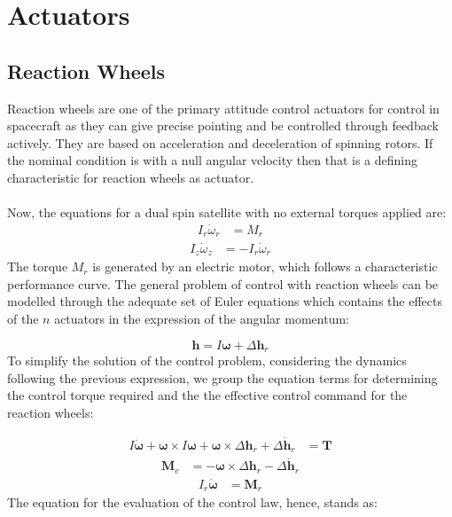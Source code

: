 \section{Actuators}
\subsection{Reaction Wheels}

Reaction wheels are one of the primary attitude control actuators for control in spacecraft as they can give precise pointing and be controlled through feedback actively. They are based on acceleration and deceleration of spinning rotors. If the nominal condition is with a null angular velocity then that is a defining characteristic for reaction wheels as actuator.\\\\
Now, the equations for a dual spin satellite with no external torques applied are:
     \begin{align*}
		  I_{r}\dot{\omega}_{r} &= M_{r}
     \end{align*}
     \begin{align*}
	    I_{z}\dot{\omega}_{z} &= -I_{r}\dot{\omega}_{r}
     \end{align*}
The torque \( M_{r} \) is generated by an electric motor, which follows a characteristic performance curve. The general problem of control with reaction wheels can be modelled through the adequate set of Euler equations which contains the effects of the \( n \) actuators in the expression of the angular momentum:

    \begin{equation*}
		\mathbf{h} = I \boldsymbol{\omega} + \Delta \mathbf{h}_r
    \end{equation*}	
To simplify the solution of the control problem, considering the dynamics following the previous expression, we group the equation terms for determining the control torque required and the the effective control command for the reaction wheels:

	\begin{align*}
	I \dot{\boldsymbol{\omega}} + \boldsymbol{\omega} \times I \boldsymbol{\omega} + \boldsymbol{\omega} \times \Delta \mathbf{h}_r + \Delta \dot{\mathbf{h}}_r &= \mathbf{T} 
	\end{align*}
	\begin{align*}
		\mathbf{M}_c &= -\boldsymbol{\omega} \times \Delta \mathbf{h}_r - \Delta \dot{\mathbf{h}}_r
	\end{align*}
	\begin{align*}
			I_r \dot{\boldsymbol{\omega}} &= \mathbf{M}_r 
	\end{align*}
The equation for the evaluation of the control law, hence, stands as:
	
